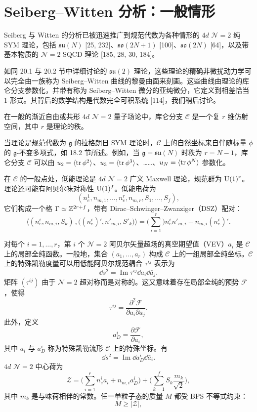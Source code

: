 \section{Seiberg–Witten 分析：一般情形}

Seiberg 与 Witten 的分析已被迅速推广到规范代数为各种情形的 $4d$ $\mathcal{N}=2$ 纯 SYM 理论，包括 $\mathfrak{su}(N)$ [25, 232]、$\mathfrak{so}(2N+1)$ [100]、$\mathfrak{so}(2N)$ [64]，以及带基本物质的 $\mathcal{N}=2$ SQCD 理论 [185, 28, 30, 184]。

如同 20.1 与 20.2 节中详细讨论的 $\mathfrak{su}(2)$ 理论，这些理论的精确非微扰动力学可以完全由一族称为 Seiberg–Witten 曲线的黎曼曲面来刻画。这些曲线由理论的库仑分支参数化，并带有称为 Seiberg–Witten 微分的亚纯微分，它定义到相差恰当 1-形式。其背后的数学结构是代数完全可积系统 [114]，我们稍后讨论。

在一般的渐近自由或共形 $4d$ $\mathcal{N}=2$ 量子场论中，库仑分支 $\mathcal{C}$ 是一个复 $r$ 维仿射空间，其中 $r$ 是理论的秩。

当理论是规范代数为 $\mathfrak{g}$ 的拉格朗日 SYM 理论时，$\mathcal{C}$ 上的自然坐标来自伴随标量 $\phi$ 的 $\mathfrak{g}$-不变多项式，如 18.2 节所述。例如，当 $\mathfrak{g}=\mathfrak{su}(N)$ 时秩为 $r=N-1$，库仑分支 $\mathcal{C}$ 可以由 $u_2=\langle\operatorname{tr}\phi^2\rangle$、$u_3=\langle\operatorname{tr}\phi^3\rangle$、……、$u_N=\langle\operatorname{tr}\phi^N\rangle$ 参数化。

在 $\mathcal{C}$ 的一般点处，低能理论是 $4d$ $\mathcal{N}=2$ 广义 Maxwell 理论，规范群为 $\operatorname{U}(1)^r$。理论还可能有阿贝尔味对称性 $\operatorname{U}(1)^f$。低能电荷为
\[
(n_e^1,n_{m,1},\dots,n_e^r,n_{m,r},S_1,\dots,S_f),
\]
它们构成一个格 $\Gamma\simeq\mathbb{Z}^{2r+f}$，带有 Dirac–Schwinger–Zwanziger（DSZ）配对：
\[
\Big\langle (n_e^i,n_{m,i},S_k)\,,\big((n_e^i)',n'_{m,i},S'_k\big)\Big\rangle
=\Big(\sum_{i=1}^{r}\Big)n_e^i n'_{m,i}-n_{m,i}(n_e^i)'.
\]

对每个 $i=1,\dots,r$，第 $i$ 个 $\mathcal{N}=2$ 阿贝尔矢量超场的真空期望值（VEV）$a_i$ 是 $\mathcal{C}$ 上的局部全纯函数。一般地，集合 $(a_1,\dots,a_r)$ 构成 $\mathcal{C}$ 上的一组局部全纯坐标。$\mathcal{C}$ 上的特殊凯勒度量可以用低能阿贝尔规范耦合 $\tau^{ij}$ 表示为
\begin{equation}
\dd s^2=\operatorname{Im}\tau^{ij}\dd a_i\dd\bar a_j.\tag{20.16}
\end{equation}
矩阵 $(\tau^{ij})$ 由于 $\mathcal{N}=2$ 超对称而是对称的。这又意味着存在局部全纯的预势 $\mathcal{F}$，使得
\[
\tau^{ij}=\frac{\partial^2\mathcal{F}}{\partial a_i\partial a_j}.
\]
此外，定义
\[
a_D^i=\frac{\partial\mathcal{F}}{\partial a_i},
\]
其中 $a_i$ 与 $a_D^i$ 称为特殊凯勒流形 $\mathcal{C}$ 上的特殊坐标。有
\[
\dd s^2=\operatorname{Im}\dd a_D^i\dd\bar a_i.
\]
$4d$ $\mathcal{N}=2$ 中心荷为
\begin{equation}
\mathcal{Z}=\Big(\sum_{i=1}^{r}n_e^i a_i+n_{m,i}a_D^i\Big)+\Big(\sum_{k=1}^{f}S_k\frac{m_k}{\sqrt{2}}\Big),\tag{20.17}
\end{equation}
其中 $m_k$ 是与味荷相伴的常数。任一单粒子态的质量 $M$ 都受 BPS 不等式约束：
\[
M\ge|\mathcal{Z}|,
\]

